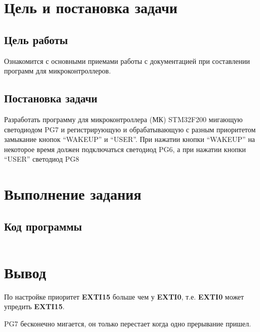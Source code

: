 \documentclass[12pt]{article} %
\begin{document}
\begin{center}

\end{center}
\doublespacing
\tableofcontents
\newpage
\section{Цель и постановка задачи}
\subsection{Цель работы}
Ознакомится с основными приемами работы с документацией при составлении программ для микроконтроллеров.
\subsection{Постановка задачи}
Разработать программу для микроконтроллера (МК) STM32F200 мигающую светодиодом PG7 и регистрирующую и обрабатывающую с разным приоритетом замыкание кнопок “WAKEUP” и “USER”. При нажатии кнопки “WAKEUP” на некоторое время должен подключаться светодиод PG6, а при нажатии кнопки “USER” светодиод PG8
\newpage
 
 \section{Выполнение задания}
 \subsection{Код программы}
 \inputminted[firstline = 1, lastline=125, breaklines]{C}{F:/git/micro/Lab3/lab3.c}
 \section{Вывод}
 По настройке приоритет \textbf{EXTI15} больше чем у \textbf{EXTI0}, т.е. \textbf{EXTI0} может упредить \textbf{EXTI15}.
 
 PG7 бесконечно мигается, он только перестает когда одно прерывание пришел. 
\end{document}

